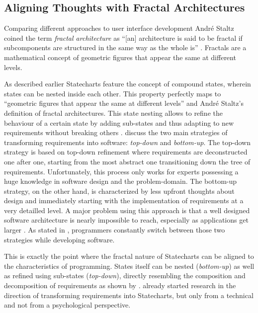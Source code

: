 \subsection{Aligning Thoughts with Fractal Architectures}
\label{sub:aligning-thoughts-with-fractal-architectures}
Comparing different approaches to user interface development André Staltz coined the term \emph{fractal architecture} as ``[an] architecture is said to be fractal if subcomponents are structured in the same way as the whole is'' \autocite{staltz_unidirectional_2015}.
Fractals are a mathematical concept of geometric figures that appear the same at different levels.

As described earlier Statecharts feature the concept of compound states, wherein states can be nested inside each other.
This property perfectly maps to ``geometric figures that appear the same at different levels'' and André Staltz's definition of fractal architectures.
This state nesting allows to refine the behaviour of a certain state by adding sub-states and thus adapting to new requirements without breaking others \autocite{harel_statecharts:_1987}.
\textcite{leveson_experiences_1991} discuss the two main strategies of transforming requirements into software: \emph{top-down} and \emph{bottom-up}.
The top-down strategy is based on top-down refinement where requirements are deconstructed one after one, starting from the most abstract one transitioning down the tree of requirements.
Unfortunately, this process only works for experts possessing a huge knowledge in software design and the problem-domain.
The bottom-up strategy, on the other hand, is characterized by less upfront thoughts about design and immediately starting with the implementation of requirements at a very detailled level.
A major problem using this approach is that a well designed software architecture is nearly impossible to reach, especially as applications get larger \autocite{horrocks_constructing_1999}.
As stated in \textcite{leveson_experiences_1991}, programmers constantly switch between those two strategies while developing software.

This is exactly the point where the fractal nature of Statecharts can be aligned to the characteristics of programming.
States itself can be nested (\emph{bottom-up}) as well as refined using sub-states (\emph{top-down}), directly resembling the composition and decomposition of requirements as shown by \textcite{leveson_experiences_1991}.
\textcite{glinz_statecharts_2002} already started research in the direction of transforming requirements into Statecharts, but only from a technical and not from a psychological perspective.


